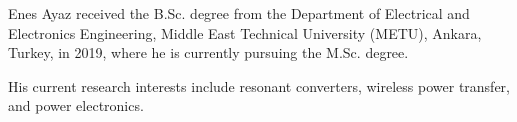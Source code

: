 \documentclass[journal]{IEEEtran}
\begin{document}


\begin{IEEEbiography}
{Enes Ayaz} received the B.Sc. degree from the Department of Electrical and Electronics Engineering, Middle East Technical University (METU), Ankara, Turkey, in 2019, where he is currently pursuing the M.Sc. degree.

His current research interests include resonant converters, wireless power transfer, and power electronics.
\end{IEEEbiography}
\end{document}
